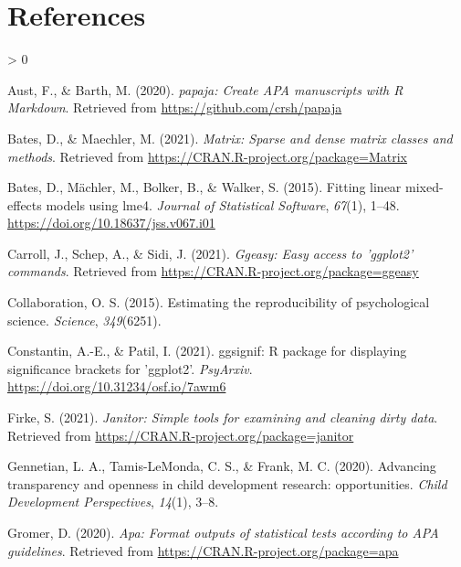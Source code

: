 \documentclass[
  english,
  man,floatsintext]{apa6}
\newlength{\cslhangindent}
\newenvironment{CSLReferences}[2] %
 {%
  \setlength{\parindent}{0pt}
  \ifodd #1 \everypar{\setlength{\hangindent}{\cslhangindent}}\ignorespaces\fi
  \ifnum #2 > 0
  \setlength{\parskip}{#2\baselineskip}
  \fi
 }%
 {}
\begin{document}
\newpage

\hypertarget{references}{%
\section{References}\label{references}}

\begingroup
\setlength{\parindent}{-0.5in}
\setlength{\leftskip}{0.5in}

\hypertarget{refs}{}
\begin{CSLReferences}{1}{0}
\leavevmode\hypertarget{ref-R-papaja}{}%
Aust, F., \& Barth, M. (2020). \emph{{papaja}: {Create} {APA} manuscripts with {R Markdown}}. Retrieved from \url{https://github.com/crsh/papaja}

\leavevmode\hypertarget{ref-R-Matrix}{}%
Bates, D., \& Maechler, M. (2021). \emph{Matrix: Sparse and dense matrix classes and methods}. Retrieved from \url{https://CRAN.R-project.org/package=Matrix}

\leavevmode\hypertarget{ref-R-lme4}{}%
Bates, D., Mächler, M., Bolker, B., \& Walker, S. (2015). Fitting linear mixed-effects models using {lme4}. \emph{Journal of Statistical Software}, \emph{67}(1), 1--48. \url{https://doi.org/10.18637/jss.v067.i01}

\leavevmode\hypertarget{ref-R-ggeasy}{}%
Carroll, J., Schep, A., \& Sidi, J. (2021). \emph{Ggeasy: Easy access to 'ggplot2' commands}. Retrieved from \url{https://CRAN.R-project.org/package=ggeasy}

\leavevmode\hypertarget{ref-open2015estimating}{}%
Collaboration, O. S. (2015). Estimating the reproducibility of psychological science. \emph{Science}, \emph{349}(6251).

\leavevmode\hypertarget{ref-R-ggsignif}{}%
Constantin, A.-E., \& Patil, I. (2021). {ggsignif}: R package for displaying significance brackets for {'ggplot2'}. \emph{PsyArxiv}. \url{https://doi.org/10.31234/osf.io/7awm6}

\leavevmode\hypertarget{ref-R-janitor}{}%
Firke, S. (2021). \emph{Janitor: Simple tools for examining and cleaning dirty data}. Retrieved from \url{https://CRAN.R-project.org/package=janitor}

\leavevmode\hypertarget{ref-gennetian2020advancing}{}%
Gennetian, L. A., Tamis-LeMonda, C. S., \& Frank, M. C. (2020). Advancing transparency and openness in child development research: opportunities. \emph{Child Development Perspectives}, \emph{14}(1), 3--8.

\leavevmode\hypertarget{ref-R-apa}{}%
Gromer, D. (2020). \emph{Apa: Format outputs of statistical tests according to APA guidelines}. Retrieved from \url{https://CRAN.R-project.org/package=apa}


\end{CSLReferences}
\end{document}

